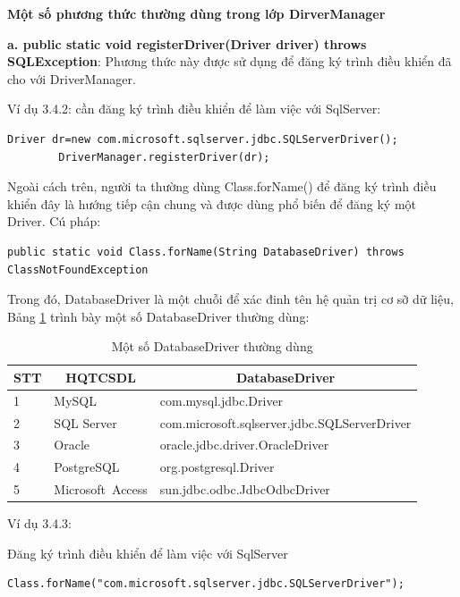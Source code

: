 \textbf{Một số phương thức thường dùng trong lớp DirverManager}


 \textbf{a. public static void registerDriver(Driver driver) throws SQLException}: 
	Phương thức này được sử dụng để đăng ký trình điều khiển đã cho với DriverManager.
	
	Ví dụ 3.4.2: cần đăng ký trình điều khiển để làm việc với SqlServer:
		\lstset{language=Java}
	\begin{lstlisting}[escapechar=`]
		Driver dr=new com.microsoft.sqlserver.jdbc.SQLServerDriver();
		DriverManager.registerDriver(dr);
	\end{lstlisting}
	
Ngoài cách trên, người ta thường dùng Class.forName()  để đăng ký trình điều khiển đây là hướng tiếp cận chung và được dùng phổ biến để đăng ký một Driver. Cú pháp:
	\lstset{language=Java}

\begin{lstlisting}[escapechar=`]
public static void Class.forName(String DatabaseDriver) throws ClassNotFoundException
\end{lstlisting}
Trong đó, DatabaseDriver là một chuỗi để xác đinh tên hệ quản trị cơ sỡ dữ liệu, Bảng \ref{bang32} trình bày một số DatabaseDriver thường dùng:
\begin{center}
	\begin{longtable}{|m{1cm}|m{2cm}|m{8cm}|}
		\caption[Một số DatabaseDriver thường dùng]{Một số DatabaseDriver thường dùng}
		\label{bang32}
		\endfirsthead
		\endhead
		\hline
		\multicolumn{1}{|c|}{\textbf{STT}} &\multicolumn{1}{c|}{	\textbf{ HQTCSDL}}
		&\multicolumn{1}{c|}{	\textbf{DatabaseDriver}}\\ \hline
		1&	MySQL & com.mysql.jdbc.Driver \\ \hline
		2&SQL Server &	com.microsoft.sqlserver.jdbc.SQLServerDriver \\ \hline
		3&	Oracle &	oracle.jdbc.driver.OracleDriver\\ \hline 
		4&	PostgreSQL &	org.postgresql.Driver \\ \hline 
		5&	Microsoft Access
		 &	sun.jdbc.odbc.JdbcOdbcDriver
		\\ \hline 
	\end{longtable}
\end{center}
\vspace{-1cm}
Ví dụ 3.4.3: 

Đăng ký trình điều khiển để làm việc với SqlServer
	\lstset{language=Java}
	\begin{lstlisting}[escapechar=`]
Class.forName("com.microsoft.sqlserver.jdbc.SQLServerDriver");
	\end{lstlisting}


